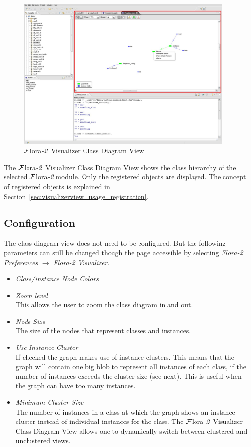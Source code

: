\documentclass[a4paper,11pt]{article}
\newcommand{\FLORA}{{\mbox{\sc ${\cal F}${lora}\rm\emph{-2}}}\xspace}
\newcommand{\FVIZ}{{\mbox{\sc ${\cal F}${lora}\rm\emph{-2} {Visualizer}}}\xspace}
\begin{document}
\begin{figure}[tbh]
	\centering
		\includegraphics[width=0.95\textwidth]{fviz_viz}
	\caption{\FVIZ Class Diagram View}
	\label{fig:fviz_viz}
\end{figure}

The \FVIZ Class Diagram View shows the class hierarchy of the selected
\FLORA module. Only the registered objects are displayed. The concept of
registered objects is explained in
Section~\ref{sec:visualizerview_usage_registration}.

\subsection{Configuration}
\label{sec:visualizerview_configuration}

The class diagram view does not need to be configured. But the following
parameters can still be changed though the page accessible by selecting
\emph{Flora-2 Preferences}
$\rightarrow$ \emph{Flora-2 Visualizer}.
\begin{itemize}
\item \emph{Class/instance Node Colors} 

\item \emph{Zoom level}  \\
  This allows the user to zoom the class diagram in and out.

\item \emph{Node Size}  \\
  The size of the nodes that represent classes and instances. 

\item \emph{Use Instance Cluster}  \\
  If checked the graph makes use of instance clusters. This means that the
  graph will contain one big blob to represent all instances of each class,
  if the number of instances exceeds the cluster size (see next).
  This is useful when the graph can have too many instances.

\item \emph{Minimum Cluster Size}  \\
  The number of instances in a class
  at which the graph shows an instance cluster instead of
  individual instances for the class.
  The \FVIZ Class Diagram View allows one to
  dynamically switch between clustered and unclustered views.
\end{itemize}
\end{document}
